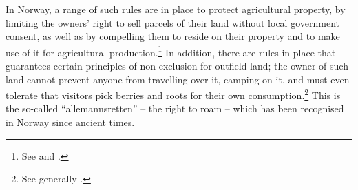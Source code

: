 In Norway, a range of such rules are in place to protect agricultural property, by limiting the owners' right to sell parcels of their land without local government consent, as well as by compelling them to reside on their property and to make use of it for agricultural production.\footnote{See \dni\cite[8|12]{la95} and \dni\cite[4|5]{lca03}.} In addition, there are rules in place that guarantees certain principles of non-exclusion for outfield land; the owner of such land cannot prevent anyone from travelling over it, camping on it, and must even tolerate that visitors pick berries and roots for their own consumption.\footnote{See generally \cite{backer07}.} This is the so-called ``allemannsretten'' -- the right to roam -- which has been recognised in Norway since ancient times.

